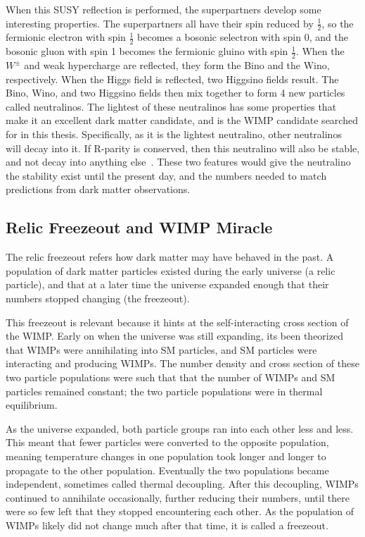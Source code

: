 When this SUSY reflection is performed, the superpartners develop some interesting properties.
The superpartners all have their spin reduced by $\frac{1}{2}$, so the fermionic electron with spin $\frac{1}{2}$ becomes a bosonic selectron with spin $0$, and the bosonic gluon with spin 1 becomes the fermionic gluino with spin $\frac{1}{2}$.
When the $W^{\pm}$  and weak hypercharge are reflected, they form the Bino and the Wino, respectively.
When the Higgs field is reflected, two Higgsino fields result.
The Bino, Wino, and two Higgsino fields then mix together to form 4 new particles called neutralinos.
The lightest of these neutralinos has some properties that make it an excellent dark matter candidate, and is the WIMP candidate searched for in this thesis.
Specifically, as it is the lightest neutralino, other neutralinos will decay into it.
If R-parity is conserved, then this neutralino will also be stable, and not decay into anything else~\cite{neutralino1,neutralino2,neutralino3}.
These two features would give the neutralino the stability exist until the present day, and the numbers needed to match predictions from dark matter observations.

\subsection{Relic Freezeout and WIMP Miracle}

The relic freezeout refers how dark matter may have behaved in the past.
A population of dark matter particles existed during the early universe (a relic particle), and that at a later time the universe expanded enough that their numbers stopped changing (the freezeout).

This freezeout is relevant because it hints at the self-interacting cross section of the WIMP.
Early on when the universe was still expanding, its been theorized that WIMPs were annihilating into SM particles, and SM particles were interacting and producing WIMPs.
The number density and cross section of these two particle populations were such that that the number of WIMPs and SM particles remained constant; the two particle populations were in thermal equilibrium.

As the universe expanded, both particle groups ran into each other less and less.
This meant that fewer particles were converted to the opposite population, meaning temperature changes in one population took longer and longer to propagate to the other population.
Eventually the two populations became independent, sometimes called thermal decoupling.
After this decoupling, WIMPs continued to annihilate occasionally, further reducing their numbers, until there were so few left that they stopped encountering each other.
As the population of WIMPs likely did not change much after that time, it is called a freezeout.

